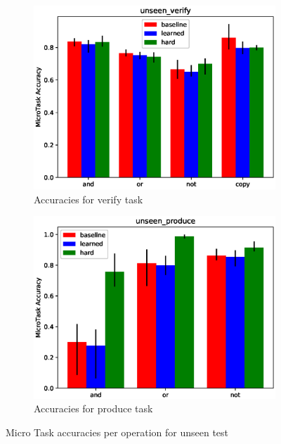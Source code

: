 \begin{figure}[ht] 
	\begin{subfigure}[b]{0.5\linewidth}
		\centering
		\includegraphics[width=0.95\linewidth]{./figs/micro/unseen_verify}
		\caption{Accuracies for verify task } 
		\label{mtu1} 
		\vspace{2ex}
	\end{subfigure}%
	\begin{subfigure}[b]{0.5\linewidth}
		\centering
		\includegraphics[width=0.95\linewidth]{./figs/micro/unseen_produce}
		\caption{Accuracies for produce task } 
		\label{mtu2} 
		\vspace{2ex}
	\end{subfigure}
	\caption{Micro Task accuracies per operation for unseen test }
	\label{mtu}
\end{figure}

